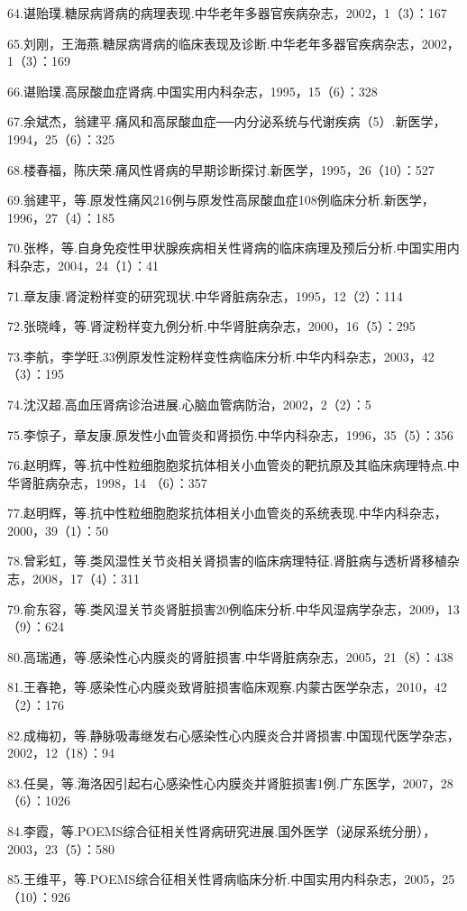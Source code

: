 64.谌贻璞.糖尿病肾病的病理表现.中华老年多器官疾病杂志，2002，1（3）：167

65.刘刚，王海燕.糖尿病肾病的临床表现及诊断.中华老年多器官疾病杂志，2002，1（3）：169

66.谌贻璞.高尿酸血症肾病.中国实用内科杂志，1995，15（6）：328

67.余斌杰，翁建平.痛风和高尿酸血症──内分泌系统与代谢疾病（5）.新医学，1994，25（6）：325

68.楼春福，陈庆荣.痛风性肾病的早期诊断探讨.新医学，1995，26（10）：527

69.翁建平，等.原发性痛风216例与原发性高尿酸血症108例临床分析.新医学，1996，27（4）：185

70.张桦，等.自身免疫性甲状腺疾病相关性肾病的临床病理及预后分析.中国实用内科杂志，2004，24（1）：41

71.章友康.肾淀粉样变的研究现状.中华肾脏病杂志，1995，12（2）：114

72.张晓峰，等.肾淀粉样变九例分析.中华肾脏病杂志，2000，16（5）：295

73.李航，李学旺.33例原发性淀粉样变性病临床分析.中华内科杂志，2003，42（3）：195

74.沈汉超.高血压肾病诊治进展.心脑血管病防治，2002，2（2）：5

75.李惊子，章友康.原发性小血管炎和肾损伤.中华内科杂志，1996，35（5）：356

76.赵明辉，等.抗中性粒细胞胞浆抗体相关小血管炎的靶抗原及其临床病理特点.中华肾脏病杂志，1998，14
（6）：357

77.赵明辉，等.抗中性粒细胞胞浆抗体相关小血管炎的系统表现.中华内科杂志，2000，39（1）：50

78.曾彩虹，等.类风湿性关节炎相关肾损害的临床病理特征.肾脏病与透析肾移植杂志，2008，17（4）：311

79.俞东容，等.类风湿关节炎肾脏损害20例临床分析.中华风湿病学杂志，2009，13（9）：624

80.高瑞通，等.感染性心内膜炎的肾脏损害.中华肾脏病杂志，2005，21（8）：438

81.王春艳，等.感染性心内膜炎致肾脏损害临床观察.内蒙古医学杂志，2010，42（2）：176

82.成梅初，等.静脉吸毒继发右心感染性心内膜炎合并肾损害.中国现代医学杂志，2002，12（18）：94

83.任昊，等.海洛因引起右心感染性心内膜炎并肾脏损害1例.广东医学，2007，28（6）：1026

84.李霞，等.POEMS综合征相关性肾病研究进展.国外医学（泌尿系统分册），2003，23（5）：580

85.王维平，等.POEMS综合征相关性肾病临床分析.中国实用内科杂志，2005，25（10）：926


